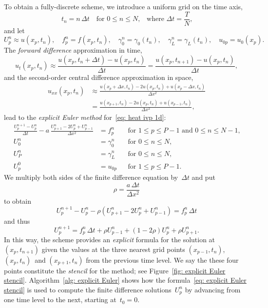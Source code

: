 To obtain a fully-discrete scheme, we introduce a uniform grid on the time axis,
\[
t_n=n\,\Delta t\quad\text{for $0\le n\le N$,}
	\quad\text{where $\Delta t=\frac{T}{N}$,}
\]
and let
\[
U^n_p\approx u(x_p,t_n),\quad
f^n_p=f(x_p,t_n),\quad
\gamma_0^n=\gamma_0(t_n),\quad
\gamma_L^n=\gamma_L(t_n),\quad
u_{0p}=u_0(x_p).
\]
The \emph{forward difference} approximation in time,
\[
u_t(x_p,t_n)\approx\frac{u(x_p,t_n+\Delta t)-u(x_p,t_n)}{\Delta t}
	=\frac{u(x_p,t_{n+1})-u(x_p,t_n)}{\Delta t},
\]
and the second-order central difference approximation in space,
\begin{align*}
u_{xx}(x_p,t_n)
&\approx\frac{u(x_p+\Delta x,t_n)-2u(x_p,t_n)+u(x_p-\Delta x,t_n)}{\Delta x^2}\\
&=\frac{u(x_{p+1},t_n)-2u(x_p,t_n)+u(x_{p-1},t_n)}{\Delta x^2},
\end{align*}
lead to the \emph{explicit Euler method} for~\eqref{eq: heat ivp 1d}:
\begin{equation}\label{eq: explicit Euler 1d}
\begin{aligned}
\frac{U^{n+1}_p-U^n_p}{\Delta t}
	-a\,\frac{U^n_{p+1}-2U^n_p+U^n_{p-1}}{\Delta x^2}&=f^n_p&
&\text{for $1\le p\le P-1$ and $0\le n\le N-1$,}\\
U^n_0&=\gamma_0^n&&\text{for $0\le n\le N$,}\\
U^n_P&=\gamma_L^n&&\text{for $0\le n\le N$,}\\
U^0_p&=u_{0p}&&\text{for $1\le p\le P-1$.}
\end{aligned}
\end{equation}
We multiply both sides of the finite difference equation by~$\Delta t$ and put
\begin{equation}\label{eq: rho explicit Euler}
\rho=\frac{a\,\Delta t}{\Delta x^2}
\end{equation}
to obtain
\[
U^{n+1}_p-U^n_p-\rho(U^n_{p+1}-2U^n_p+U^n_{p-1})=f^n_p\,\Delta t
\]
and thus
\begin{equation}\label{eq: explicit Euler stencil}
U^{n+1}_p=f^n_p\,\Delta t+\rho U^n_{p-1}+(1-2\rho)U^n_p+\rho U^n_{p+1}.
\end{equation}
In this way, the scheme provides an \emph{explicit} formula for the solution 
at~$(x_p,t_{n+1})$ given the values at the three nearest grid 
points $(x_{p-1},t_n)$, $(x_p,t_n)$~and $(x_{p+1},t_n)$ from the previous time 
level.  We say the these four points constitute the \emph{stencil} for the 
method; see Figure~\ref{fig: explicit Euler stencil}.
Algorithm~\ref{alg: explicit Euler} shows how the 
formula~\eqref{eq: explicit Euler stencil} is used to compute the finite 
difference solutions~$U^n_p$ by advancing from one time level to the next, 
starting at~$t_0=0$.  

